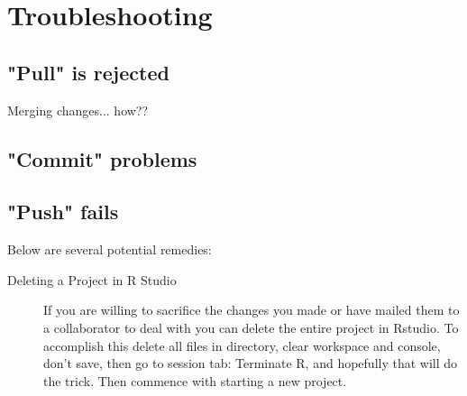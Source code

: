\documentclass{article}
\begin{document}
\section{Troubleshooting}

\subsection{"Pull" is rejected}

Merging changes... how??

\subsection{"Commit" problems}

\subsection{"Push" fails}

Below are several potential remedies:

\begin{description}
  \item[Deleting a Project in R Studio]If you are willing to sacrifice the changes you made or have mailed them to a collaborator to deal with you can delete the entire project in Rstudio. To accomplish this delete all files in directory, clear workspace and console, don't save, then go to session tab: Terminate R, and hopefully that will do the trick. Then commence with starting a new project. 

\end{description}
\end{document}

